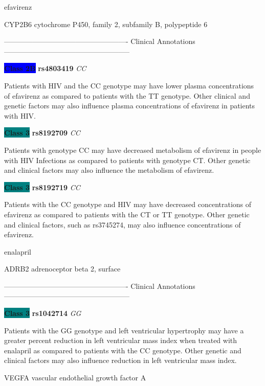 \documentclass{resume} %
\begin{document}
\begin{rSection}{ efavirenz }
\begin{rSubsection}{ CYP2B6 }{ cytochrome P450, family 2, subfamily B, polypeptide 6 }{}{}
\item[] ---------------------------------------------------- Clinical Annotations -----------------------------------------------------\newline
\item \textbf{\colorbox{blue} {Class 2B}} \textbf{ rs4803419 } \textit{ CC }
\item[] Patients with HIV and the CC genotype may have lower plasma concentrations of efavirenz as compared to patients with the TT genotype. Other clinical and genetic factors may also influence plasma concentrations of efavirenz in patients with HIV.\item \textbf{\colorbox{teal} {Class 3}} \textbf{ rs8192709 } \textit{ CC }
\item[] Patients with genotype CC may have decreased metabolism of efavirenz in people with HIV Infections as compared to patients with genotype CT. Other genetic and clinical factors may also influence the metabolism of efavirenz.\item \textbf{\colorbox{teal} {Class 3}} \textbf{ rs8192719 } \textit{ CC }
\item[] Patients with the CC genotype and HIV may have decreased concentrations of efavirenz as compared to patients with the CT or TT genotype. Other genetic and clinical factors, such as rs3745274, may also influence concentrations of efavirenz. 
\end{rSubsection}

\end{rSection}\begin{rSection}{ enalapril }
\item[]

\begin{rSubsection}{ ADRB2 }{ adrenoceptor beta 2, surface }{}{}
\item[]

\item[] ---------------------------------------------------- Clinical Annotations -----------------------------------------------------\newline
\item \textbf{\colorbox{teal} {Class 3}} \textbf{ rs1042714 } \textit{ GG }
\item[] Patients with the GG genotype and left ventricular hypertrophy may have a greater percent reduction in left ventricular mass index when treated with enalapril as compared to patients with the CC genotype. Other genetic and clinical factors may also influence reduction in left ventricular mass index. 
\end{rSubsection}\begin{rSubsection}{ VEGFA }{ vascular endothelial growth factor A }{}{}
\item[]


\end{rSubsection}
\end{rSection}
\end{document}
